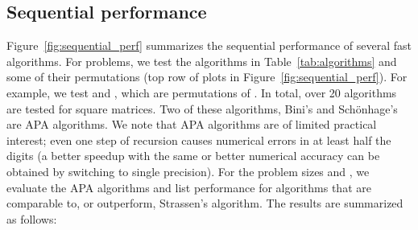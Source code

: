 \documentclass[preprint]{sigplanconf}
\begin{document}
\subsection{Sequential performance}
\label{sec:perf_sequential}

Figure~\ref{fig:sequential_perf} summarizes the sequential performance of several fast algorithms.
For  problems, we test the algorithms in Table~\ref{tab:algorithms} and some of their permutations (top row of plots in Figure~\ref{fig:sequential_perf}).
For example, we test  and , which are permutations of .
In total, over 20 algorithms are tested for square matrices.
Two of these algorithms, Bini's  and Sch\"{o}nhage's  are APA algorithms.
We note that APA algorithms are of limited practical interest; even one step of recursion causes numerical errors in at least half the digits (a better speedup with the same or better numerical accuracy can be obtained by switching to single precision).
For the problem sizes  and , we evaluate the APA algorithms and list performance for algorithms that are comparable to, or outperform, Strassen's algorithm.
The results are summarized as follows:
\end{document}
